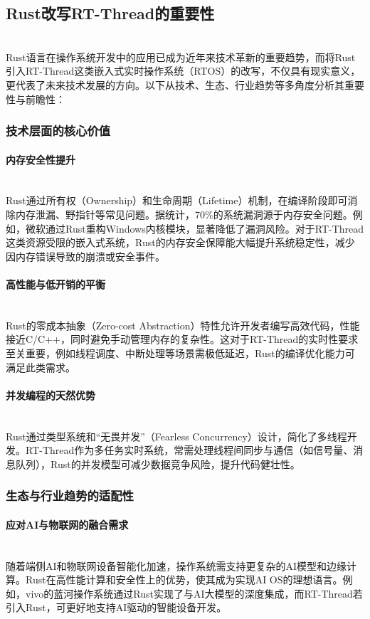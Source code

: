\subsection{Rust改写RT-Thread的重要性}\ \\
\indent Rust语言在操作系统开发中的应用已成为近年来技术革新的重要趋势，而将Rust引入RT-Thread这类嵌入式实时操作系统（RTOS）的改写，不仅具有现实意义，更代表了未来技术发展的方向。以下从技术、生态、行业趋势等多角度分析其重要性与前瞻性： \\
\subsubsection{技术层面的核心价值}
\paragraph{内存安全性提升}\ \\
 \indent Rust通过所有权（Ownership）和生命周期（Lifetime）机制，在编译阶段即可消除内存泄漏、野指针等常见问题。据统计，70\%的系统漏洞源于内存安全问题。例如，微软通过Rust重构Windows内核模块，显著降低了漏洞风险。对于RT-Thread这类资源受限的嵌入式系统，Rust的内存安全保障能大幅提升系统稳定性，减少因内存错误导致的崩溃或安全事件。\cite{15}
\paragraph{高性能与低开销的平衡}\ \\
 \indent Rust的零成本抽象（Zero-cost Abstraction）特性允许开发者编写高效代码，性能接近C/C++，同时避免手动管理内存的复杂性。这对于RT-Thread的实时性要求至关重要，例如线程调度、中断处理等场景需极低延迟，Rust的编译优化能力可满足此类需求。\cite{17}
\paragraph{并发编程的天然优势}\ \\
 \indent Rust通过类型系统和“无畏并发”（Fearless Concurrency）设计，简化了多线程开发。RT-Thread作为多任务实时系统，常需处理线程间同步与通信（如信号量、消息队列），Rust的并发模型可减少数据竞争风险，提升代码健壮性。\cite{17}
\subsubsection{生态与行业趋势的适配性}
\paragraph{应对AI与物联网的融合需求}\ \\
 \indent 随着端侧AI和物联网设备智能化加速，操作系统需支持更复杂的AI模型和边缘计算。Rust在高性能计算和安全性上的优势，使其成为实现AI OS的理想语言。例如，vivo的蓝河操作系统通过Rust实现了与AI大模型的深度集成，而RT-Thread若引入Rust，可更好地支持AI驱动的智能设备开发。\cite{4}
